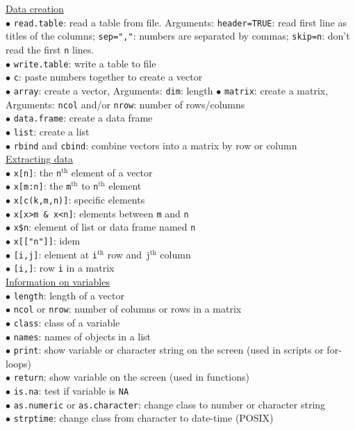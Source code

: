\documentclass[a4paper,11pt,twocolumn,tablecaptionabove]{scrartcl}
\begin{document}
\noindent \underline{Data creation}\\
$\bullet$ \texttt{read.table}: read a table from file. Arguments: \texttt{header=TRUE}: read first line as titles of the columns; \texttt{sep=","}: numbers are separated by commas; \texttt{skip=n}: don't read the first \texttt{n} lines.\\
$\bullet$ \texttt{write.table}: write a table to file\\
$\bullet$ \texttt{c}: paste numbers together to create a vector\\
$\bullet$ \texttt{array}: create a vector, Arguments: \texttt{dim}: length
$\bullet$ \texttt{matrix}: create a matrix, Arguments: \texttt{ncol} and/or \texttt{nrow}: number of rows/columns\\
$\bullet$ \texttt{data.frame}: create a data frame\\
$\bullet$ \texttt{list}: create a list\\
$\bullet$ \texttt{rbind} and \texttt{cbind}: combine vectors into a matrix by row or column\\

\noindent \underline{Extracting data}\\
$\bullet$ \texttt{x[n]}: the \texttt{n}$\mathrm{^{th}}$ element of a vector\\
$\bullet$ \texttt{x[m:n]}: the \texttt{m}$\mathrm{^{th}}$ to \texttt{n}$\mathrm{^{th}}$ element\\
$\bullet$ \texttt{x[c(k,m,n)]}: specific elements\\
$\bullet$ \texttt{x[x>m \& x<n]}: elements between \texttt{m} and \texttt{n}\\
$\bullet$ \verb!x$n!:  element of list or data frame named \texttt{n}\\  %
$\bullet$ \texttt{x[["n"]]}: idem\\
$\bullet$ \texttt{[i,j]}: element at \texttt{i}$\mathrm{^{th}}$ row and\texttt{ }j$\mathrm{^{th}}$ column \\
$\bullet$ \texttt{[i,]}: row \texttt{i} in a matrix\\

\noindent \underline{Information on variables}\\
$\bullet$ \texttt{length}: length of a vector\\
$\bullet$ \texttt{ncol} or \texttt{nrow}: number of columns or rows in a matrix\\
$\bullet$ \texttt{class}: class of a variable \\
$\bullet$ \texttt{names}: names of objects in a list \\
$\bullet$ \texttt{print}: show variable or character string on the screen (used in scripts or for-loops) \\
$\bullet$ \texttt{return}: show variable on the screen (used in functions) \\
$\bullet$ \texttt{is.na}: test if variable is \texttt{NA}\\
$\bullet$ \texttt{as.numeric} or \texttt{as.character}: change class to number or character string\\
$\bullet$ \texttt{strptime}: change class from character to date-time (POSIX)\\
\end{document}
